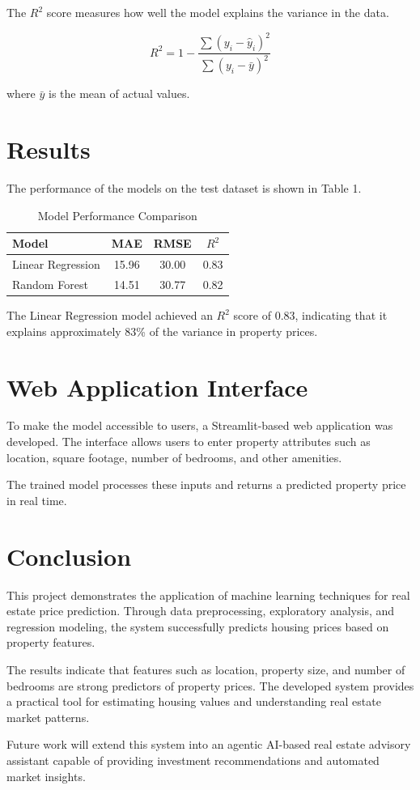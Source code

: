 \documentclass[12pt]{article}
\begin{document}
The $R^2$ score measures how well the model explains the variance in the data.

\[
R^2 = 1 - \frac{\sum (y_i - \hat{y}_i)^2}{\sum (y_i - \bar{y})^2}
\]

where $\bar{y}$ is the mean of actual values.

\section{Results}

The performance of the models on the test dataset is shown in Table 1.

\begin{table}[h]
\centering
\begin{tabular}{lccc}
\toprule
Model & MAE & RMSE & $R^2$ \\
\midrule
Linear Regression & 15.96 & 30.00 & 0.83 \\
Random Forest & 14.51 & 30.77 & 0.82 \\
\bottomrule
\end{tabular}
\caption{Model Performance Comparison}
\end{table}

The Linear Regression model achieved an $R^2$ score of 0.83, indicating that it explains approximately 83\% of the variance in property prices.

\section{Web Application Interface}

To make the model accessible to users, a Streamlit-based web application was developed. The interface allows users to enter property attributes such as location, square footage, number of bedrooms, and other amenities.

The trained model processes these inputs and returns a predicted property price in real time.

\section{Conclusion}

This project demonstrates the application of machine learning techniques for real estate price prediction. Through data preprocessing, exploratory analysis, and regression modeling, the system successfully predicts housing prices based on property features.

The results indicate that features such as location, property size, and number of bedrooms are strong predictors of property prices. The developed system provides a practical tool for estimating housing values and understanding real estate market patterns.

Future work will extend this system into an agentic AI-based real estate advisory assistant capable of providing investment recommendations and automated market insights.
\end{document}
